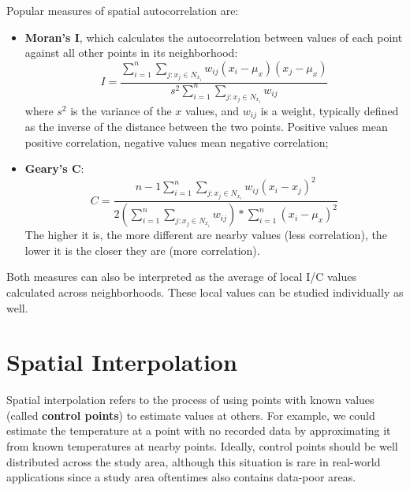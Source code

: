 Popular measures of spatial autocorrelation are:    
\begin{itemize}
    \item \textbf{Moran's I}, which calculates the autocorrelation between values of each point against all other points in its neighborhood:
    \begin{equation*}
        I = \frac{\sum_{i=1}^n \sum_{j: x_j \in N_{x_i}} w_{ij} (x_i - \mu_x)(x_j - \mu_x)}{s^2 \sum_{i=1}^n \sum_{j: x_j \in N_{x_i}} w_{ij}} 
    \end{equation*}
    where $s^2$ is the variance of the $x$ values, and $w_{ij}$ is a weight, typically defined as the inverse of the distance between the two points. Positive values mean positive correlation, negative values mean negative correlation;
    \item \textbf{Geary's C}:
    \begin{equation*}
        C = \frac{n-1 \sum_{i=1}^n \sum_{j: x_j \in N_{x_i}} w_{ij} (x_i - x_j)^2}{2 (\sum_{i=1}^n \sum_{j: x_j \in N_{x_i}} w_{ij}) * \sum_{i=1}^n (x_i - \mu_x)^2}
    \end{equation*}
    The higher it is, the more different are nearby values (less correlation), the lower it is the closer they are (more correlation).
\end{itemize}
Both measures can also be interpreted as the average of local I/C values calculated across neighborhoods. These local values can be studied individually as well.

\section{Spatial Interpolation}

Spatial interpolation refers to the process of using points with known values (called \textbf{control points}) to estimate values at others. For example, we could estimate the temperature at a point with no recorded data by approximating it from known temperatures at nearby points. Ideally, control points should be well distributed across the study area, although this situation is rare in real-world applications since a study area oftentimes also contains data-poor areas.

